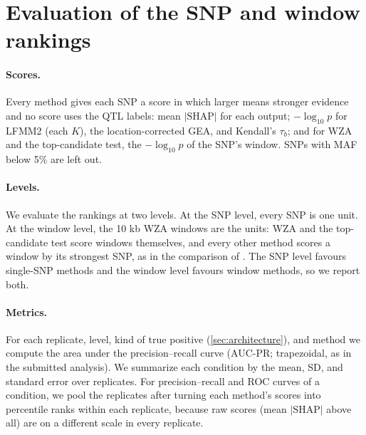 

\section{Evaluation of the SNP and window rankings}
\label{sec:evaluation}

\paragraph{Scores.} Every method gives each SNP a score in which larger
means stronger evidence and no score uses the QTL labels: mean
$|\text{SHAP}|$ for each output; $-\log_{10} p$ for LFMM2 (each $K$), the
location-corrected GEA, and Kendall's $\tau_b$; and for WZA and the
top-candidate test, the $-\log_{10} p$ of the SNP's window. SNPs with MAF
below 5\% are left out.

\paragraph{Levels.} We evaluate the rankings at two levels.
At the SNP level, every SNP is one unit.
At the window level, the 10 kb WZA windows are the units: WZA and the
top-candidate test score windows themselves, and every other method scores
a window by its strongest SNP, as in the comparison of
\citet{booker_wza_2024}. The SNP level favours single-SNP methods and the
window level favours window methods, so we report both.

\paragraph{Metrics.} For each replicate, level, kind of true positive
(\cref{sec:architecture}), and method we compute the area under the
precision--recall curve (AUC-PR; trapezoidal, as in the submitted
analysis). We summarize each condition by the mean, SD, and standard error
over replicates. For precision--recall and ROC curves of a condition, we
pool the replicates after turning each method's scores into percentile
ranks within each replicate, because raw scores (mean $|\text{SHAP}|$ above
all) are on a different scale in every replicate.

